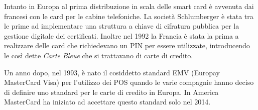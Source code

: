 Intanto in Europa al prima distribuzione in scala delle smart card è avvenuta dai francesi con le card per le cabine telefoniche. La società Schlumberger è stata tra le prime ad implementare una struttura a chiave di cifratura pubblica per la gestione digitale dei certificati. Inoltre nel 1992 la Francia è stata la prima a realizzare delle card che richiedevano un PIN per essere utilizzate, introducendo le così dette  \textit{Carte Bleue} che si trattavano di carte di credito.

Un anno dopo, nel 1993, è nato il cosiddetto standard EMV (Europay MasterCard Visa) per l'utilizzo dei POS quando le varie compagnie hanno deciso di definire uno standard per le carte di credito in Europa. In America MasterCard ha iniziato ad accettare questo standard solo nel 2014.
\cite{history}

    

